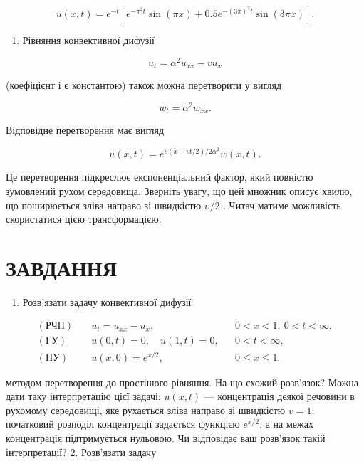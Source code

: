 \documentclass[
  ukrainian,
]{article}
\providecommand{\tightlist}{%
  \setlength{\itemsep}{0pt}\setlength{\parskip}{0pt}}
\begin{document}
\[
u(x, t) = e^{-t} \left[ e^{-\pi^2 t} \sin(\pi x) + 0.5e^{-(3\pi)^2 t} \sin(3\pi x) \right].
\]

\begin{enumerate}
\def\labelenumi{\arabic{enumi}.}
\setcounter{enumi}{1}
\tightlist
\item
  Рівняння конвективної дифузії
\end{enumerate}

\[
u_t = \alpha^2 u_{xx} - v u_x
\]

(коефіцієнт і є константою) також можна перетворити у вигляд

\[
w_t = \alpha^2 w_{xx}.
\]

Відповідне перетворення має вигляд

\[
u(x, t) = e^{v(x-vt/2)/2\alpha^2}w(x, t).
\]

Це перетворення підкреслює експоненціальний фактор, який повністю
зумовлений рухом середовища. Зверніть увагу, що цей множник описує
хвилю, що поширюється зліва направо зі швидкістю \(\upsilon/2\) . Читач
матиме можливість скористатися цією трансформацією.

\section{ЗАВДАННЯ}\label{ux437ux430ux432ux434ux430ux43dux43dux44f-7}

\begin{enumerate}
\def\labelenumi{\arabic{enumi}.}
\tightlist
\item
  Розв'язати задачу конвективної дифузії
\end{enumerate}

\[
\begin{aligned}
(\text{РЧП})\quad & u_t = u_{xx} - u_x, && 0 < x < 1,\ 0 < t < \infty, \\
(\text{ГУ})\quad & u(0,t) = 0,\quad u(1,t) = 0, && 0 < t < \infty, \\
(\text{ПУ})\quad & u(x,0) = e^{x/2}, && 0 \leqslant x \leqslant 1.
\end{aligned}
\]

методом перетворення до простішого рівняння. На що схожий розв'язок?
Можна дати таку інтерпретацію цієї задачі: \(u(x,t)\) --- концентрація
деякої речовини в рухомому середовищі, яке рухається зліва направо зі
швидкістю \(v = 1\); початковий розподіл концентрації задається функцією
\(e^{x/2}\), а на межах концентрація підтримується нульовою. Чи
відповідає ваш розв'язок такій інтерпретації? 2. Розв'язати задачу
\end{document}
